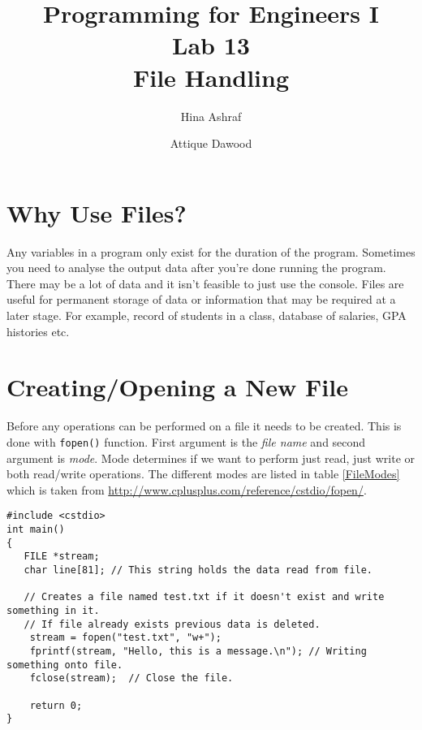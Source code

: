 \documentclass[12pt,a4paper]{article}
\title{\vspace{-2cm}Programming for Engineers I\\Lab 13\\File Handling}
\author{Hina Ashraf\and Attique Dawood}
\begin{document}
\maketitle
\section{Why Use Files?}
Any variables in a program only exist for the duration of the program. Sometimes you need to analyse the output data after you're done running the program. There may be a lot of data and it isn't feasible to just use the console. Files are useful for permanent storage of data or information that may be required at a later stage. For example, record of students in a class, database of salaries, GPA histories etc.
\section{Creating/Opening a New File}
Before any operations can be performed on a file it needs to be created. This is done with \verb|fopen()| function. First argument is the \emph{file name} and second argument is \emph{mode}. Mode determines if we want to perform just read, just write or both read/write operations. The different modes are listed in table \ref{FileModes} which is taken from \url{http://www.cplusplus.com/reference/cstdio/fopen/}.
\begin{lstlisting}[caption={Creating and opening a new file}]
#include <cstdio>
int main()
{
   FILE *stream;
   char line[81]; // This string holds the data read from file.

   // Creates a file named test.txt if it doesn't exist and write something in it.
   // If file already exists previous data is deleted.
	stream = fopen("test.txt", "w+");
	fprintf(stream, "Hello, this is a message.\n"); // Writing something onto file.
	fclose(stream);  // Close the file.

	return 0;
}
\end{lstlisting}
\end{document}
